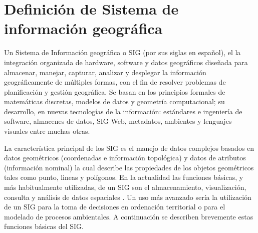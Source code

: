 \section{Definición de Sistema de información geográfica}
\label{sec:cap2-definicion-sig}

Un Sistema de Información geográfica o SIG (por sus siglas en español), el la integración
organizada de hardware, software y datos geográficos diseñada para almacenar, manejar, capturar,
analizar y desplegar la información geográficamente de múltiples formas, con el fin de resolver
problemas de planificación y gestión geográfica\citep{lopezMarcos2007}. Se basan en los principios
formales de matemáticas discretas, modelos de datos y geometría computacional; su desarrollo, en
nuevas tecnologías de la información: estándares e ingeniería de software, almacenes de datos,
SIG Web, metadatos, ambientes y lenguajes visuales entre muchas otras\citep{lunaPaulina2010}.

La característica principal de los SIG es el manejo de datos complejos basados en datos
geométricos (coordenadas e información topológica) y datos de atributos (información nominal) la
cual describe las propiedades de los objetos geométricos tales como punto, lineas y polígonos. En
la actualidad las funciones básicas, y más habitualmente utilizadas, de un SIG son el
almacenamiento, visualización, consulta y análisis de datos espaciales \citep{fAlonsoSig2006}. Un
uso más avanzado sería la utilización de un SIG para la toma de decisiones en ordenación
territorial o para el modelado de procesos ambientales. A continuación se describen brevemente
estas funciones básicas del SIG.

